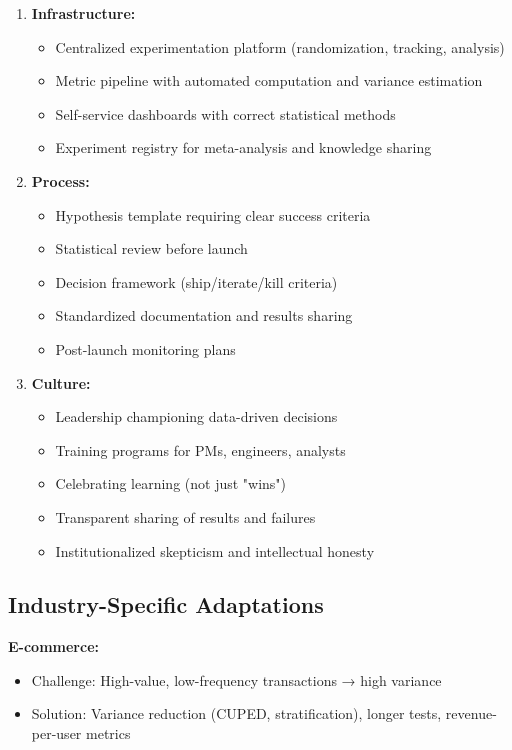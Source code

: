 \begin{enumerate}
    \item \textbf{Infrastructure:}
    \begin{itemize}
        \item Centralized experimentation platform (randomization, tracking, analysis)
        \item Metric pipeline with automated computation and variance estimation
        \item Self-service dashboards with correct statistical methods
        \item Experiment registry for meta-analysis and knowledge sharing
    \end{itemize}

    \item \textbf{Process:}
    \begin{itemize}
        \item Hypothesis template requiring clear success criteria
        \item Statistical review before launch
        \item Decision framework (ship/iterate/kill criteria)
        \item Standardized documentation and results sharing
        \item Post-launch monitoring plans
    \end{itemize}

    \item \textbf{Culture:}
    \begin{itemize}
        \item Leadership championing data-driven decisions
        \item Training programs for PMs, engineers, analysts
        \item Celebrating learning (not just "wins")
        \item Transparent sharing of results and failures
        \item Institutionalized skepticism and intellectual honesty
    \end{itemize}
\end{enumerate}

\subsection{Industry-Specific Adaptations}

\textbf{E-commerce:}
\begin{itemize}
    \item Challenge: High-value, low-frequency transactions → high variance
    \item Solution: Variance reduction (CUPED, stratification), longer tests, revenue-per-user metrics
\end{itemize}

